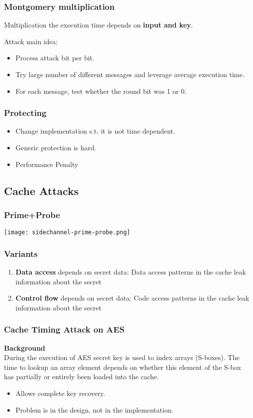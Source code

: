 \subsubsection{Montgomery multiplication}
Multiplication the execution time depends on \textbf{input and key}.

Attack main idea:
\begin{itemize}
  \item Process attack bit per bit.
  \item Try large number of different messages and leverage average execution
    time.
  \item For each message, test whether the round bit was 1 or 0.
\end{itemize}

\subsubsection{Protecting}
\begin{itemize}
  \item Change implementation s.t. it is not time dependent.
  \item Generic protection is hard.
  \item Performance Penalty
\end{itemize}


\subsection{Cache Attacks}
\subsubsection{Prime+Probe}
\texttt{[image: sidechannel-prime-probe.png]}
\subsubsection{Variants}
\begin{enumerate}
  \item \textbf{Data access} depends on secret data: Data access patterns
    in the cache leak information about the secret
  \item \textbf{Control flow} depends on secret data: Code access
    patterns in the cache leak information about the secret
\end{enumerate}
\subsubsection{Cache Timing Attack on AES}
\textbf{Background}\\
During the execution of AES secret key is used to
index arrays (S-boxes). The time to lookup an array element depends
on whether this element of the S-box has partially or entirely been loaded into the
cache.
\begin{itemize}
  \item Allows complete key recovery.
  \item Problem is in the design, not in the implementation.
\end{itemize}

